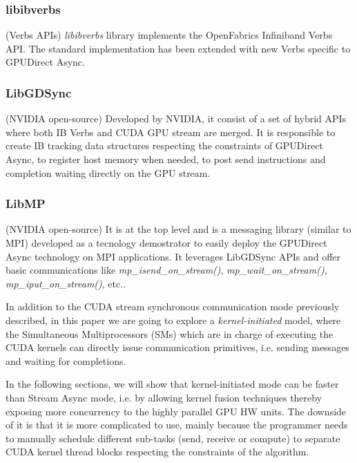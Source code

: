 \documentclass[conference]{IEEEtran}
\begin{document}
\subsubsection{libibverbs}(Verbs APIs)
\emph{libibverbs} library implements the OpenFabrics Infiniband Verbs API. The standard implementation has been extended with new Verbs specific to GPUDirect Async.

\subsubsection{LibGDSync}(NVIDIA open-source)
Developed by NVIDIA, it consist of a set of hybrid APIs where both IB Verbs and CUDA GPU stream are merged. It is responsible to create IB tracking data structures respecting the constraints of GPUDirect Async, to register host memory when needed, to post send instructions and completion waiting directly on the GPU stream.
 
\subsubsection{LibMP}(NVIDIA open-source)
It is at the top level and is a messaging library (similar to MPI) developed as a tecnology demostrator to easily deploy the GPUDirect Async technology on MPI applications.
It leverages LibGDSync APIs and offer basic communications like \textit{mp\_isend\_on\_stream()}, \textit{mp\_wait\_on\_stream()}, \textit{mp\_iput\_on\_stream()}, etc.. 

In addition to the CUDA stream synchronous communication mode previously described, in this paper we are going to explore a \textit{kernel-initiated} model, where the Simultaneous Multiprocessors (SMs) which are in charge of executing the CUDA kernels can directly issue communication primitives, i.e. sending messages and waiting for completions.


In the following sections, we will show that kernel-initiated mode can be faster than Stream Async mode, i.e. by allowing kernel fusion techniques thereby exposing more concurrency to the highly parallel GPU HW units. The downside of it is that it is more complicated to use, mainly because the programmer needs to manually schedule different sub-tasks (send, receive or compute) to separate CUDA kernel thread blocks respecting the constraints of the algorithm.
\end{document}
